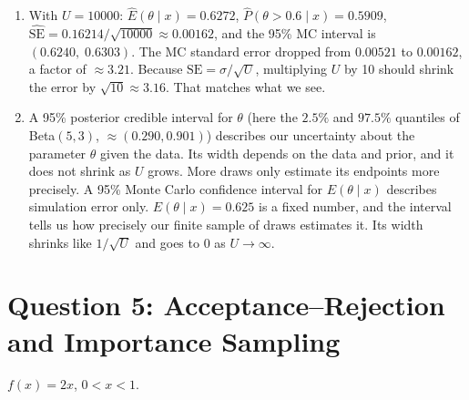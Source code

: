 \documentclass[11pt]{article}
\begin{document}
\begin{enumerate}
\item[(d)] With $U = 10000$: $\widehat{E}(\theta\mid x) = 0.6272$, $\widehat{P}(\theta>0.6\mid x) = 0.5909$, $\widehat{\text{SE}} = 0.16214/\sqrt{10000} \approx 0.00162$, and the 95\% MC interval is $(0.6240,\; 0.6303)$.
The MC standard error dropped from $0.00521$ to $0.00162$, a factor of $\approx 3.21$. Because $\text{SE} = \sigma/\sqrt{U}$, multiplying $U$ by 10 should shrink the error by $\sqrt{10} \approx 3.16$. That matches what we see.

\item[(e)] A 95\% posterior credible interval for $\theta$ (here the $2.5\%$ and $97.5\%$ quantiles of Beta$(5,3)$, $\approx (0.290, 0.901)$) describes our uncertainty about the parameter $\theta$ given the data. Its width depends on the data and prior, and it does not shrink as $U$ grows. More draws only estimate its endpoints more precisely. A 95\% Monte Carlo confidence interval for $E(\theta\mid x)$ describes simulation error only. $E(\theta \mid x) = 0.625$ is a fixed number, and the interval tells us how precisely our finite sample of draws estimates it. Its width shrinks like $1/\sqrt{U}$ and goes to 0 as $U\to\infty$.
\end{enumerate}

\section*{Question 5: Acceptance--Rejection and Importance Sampling}

$f(x) = 2x$, $0 < x < 1$.
\end{document}
